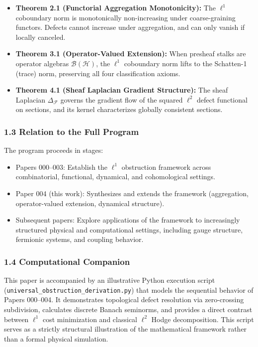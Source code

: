 \documentclass[
]{article}
\begin{document}
\begin{itemize}
\item
  \textbf{Theorem 2.1 (Functorial Aggregation Monotonicity):} The
  \(\ell^1\) coboundary norm is monotonically non-increasing under
  coarse-graining functors. Defects cannot increase under aggregation,
  and can only vanish if locally canceled.
\item
  \textbf{Theorem 3.1 (Operator-Valued Extension):} When presheaf stalks
  are operator algebras \(\mathcal{B}(\mathcal{H})\), the \(\ell^1\)
  coboundary norm lifts to the Schatten-1 (trace) norm, preserving all
  four classification axioms.
\item
  \textbf{Theorem 4.1 (Sheaf Laplacian Gradient Structure):} The sheaf
  Laplacian \(\Delta_\mathcal{F}\) governs the gradient flow of the
  squared \(\ell^2\) defect functional on sections, and its kernel
  characterizes globally consistent sections.
\end{itemize}

\subsubsection{1.3 Relation to the Full
Program}\label{relation-to-the-full-program}

The program proceeds in stages:

\begin{itemize}
\item
  Papers 000--003: Establish the \(\ell^1\) obstruction framework across
  combinatorial, functional, dynamical, and cohomological settings.
\item
  Paper 004 (this work): Synthesizes and extends the framework
  (aggregation, operator-valued extension, dynamical structure).
\item
  Subsequent papers: Explore applications of the framework to
  increasingly structured physical and computational settings, including
  gauge structure, fermionic systems, and coupling behavior.
\end{itemize}

\subsubsection{1.4 Computational
Companion}\label{computational-companion}

This paper is accompanied by an illustrative Python execution script
(\texttt{universal\_obstruction\_derivation.py}) that models the
sequential behavior of Papers 000--004. It demonstrates topological
defect resolution via zero-crossing subdivision, calculates discrete
Banach seminorms, and provides a direct contrast between \(\ell^1\) cost
minimization and classical \(\ell^2\) Hodge decomposition. This script
serves as a strictly structural illustration of the mathematical
framework rather than a formal physical simulation.
\end{document}
